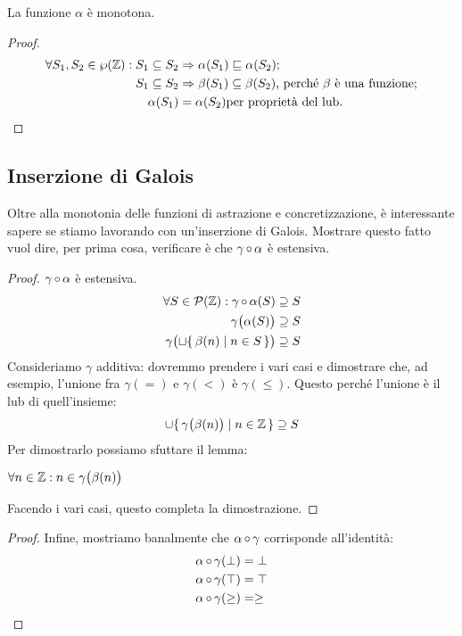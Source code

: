 \begin{proposizione}
La funzione $\alpha$ è monotona.
\end{proposizione}
\begin{proof}
	\begin{align*}
		\forall S_1, S_2 \in \wp(\mathbb{Z}) \mathrel{:} S_1 \subseteq S_2 &\Rightarrow \alpha(S_1) \sqsubseteq \alpha(S_2)\text{;} \\
		S_1 \subseteq S_2 &\Rightarrow \beta(S_1) \subseteq \beta(S_2) \text{, perché } \beta \text{ è  una funzione;} \\
		\alpha(S_1) &= \alpha(S_2) \text{per proprietà del lub.}
	\end{align*}
\end{proof}

\subsection{Inserzione di Galois}

Oltre alla monotonia delle funzioni di astrazione e concretizzazione,
è interessante sapere se stiamo lavorando con un'inserzione di Galois.
Mostrare questo fatto vuol dire, per prima cosa,
verificare è che $\mathrm{\gamma}\mathop{\circ}\mathrm{\alpha}$ è estensiva. 

\begin{proof}
$\mathrm{\gamma}\mathop{\circ}\mathrm{\alpha}$ è estensiva.
\begin{align*}
	\forall S \in \mathcal{P}(\mathbb{Z}) \mathrel{:} \mathrm{\gamma}\mathop{\circ}\mathrm{\alpha}(S) &\supseteq S \\
	\gamma\bigl(\alpha(S)\bigr) &\supseteq S \\
	\gamma\bigl(\sqcup \{\, \beta(n) \mid n \in S \,\} \bigr) &\supseteq S
\end{align*}
Consideriamo $\gamma$ additiva: dovremmo prendere i vari casi e
dimostrare che, ad esempio, l'unione fra
$\gamma(=)$ e $\gamma(<)$ è $\gamma(\leq)$.
Questo perché l'unione è il lub di quell'insieme:
\[
	\cup \{\, \gamma\bigl(\beta(n)\bigr) \mid n \in \mathbb{Z} \,\} \supseteq S
\]
Per dimostrarlo possiamo sfuttare il lemma:
\begin{lemma}
	$ \forall n \in \mathbb{Z} \mathrel{:} n \in \gamma\bigl(\beta(n)\bigr) $
\end{lemma}
Facendo i vari casi, questo completa la dimostrazione.
\end{proof}

\begin{proof}
Infine, mostriamo banalmente che $\mathrm{\alpha}\mathop{\circ}\mathrm{\gamma}$ corrisponde all'identità:
\begin{align*}
	\mathrm{\alpha}\mathop{\circ}\mathrm{\gamma}(\bot) &= \bot \\
	\mathrm{\alpha}\mathop{\circ}\mathrm{\gamma}(\top) &= \top \\
	\mathrm{\alpha}\mathop{\circ}\mathrm{\gamma}(\geq) &= \geq
\end{align*}
\end{proof}

